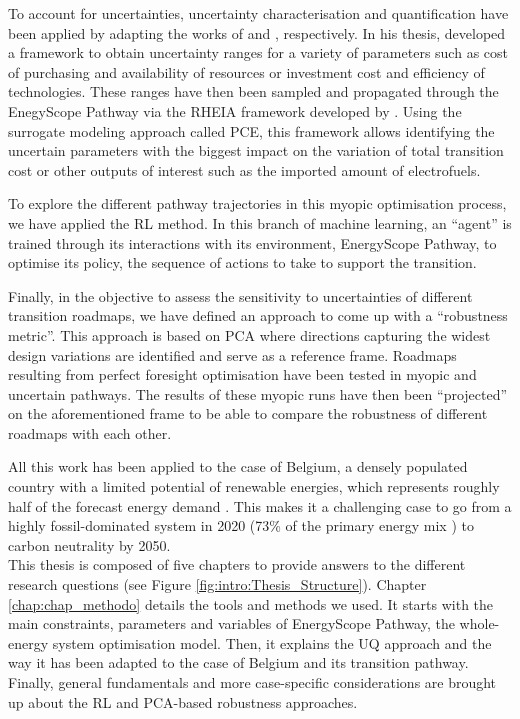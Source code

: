 To account for uncertainties, uncertainty characterisation and quantification have been applied by adapting the works of \citet{Moret2017PhDThesis} and \citet{coppittersthesis}, respectively. In his thesis, \citet{Moret2017PhDThesis} developed a framework to obtain uncertainty ranges for a variety of parameters such as cost of purchasing and availability of resources or investment cost and efficiency of technologies. These ranges have then been sampled and propagated through the EnegyScope Pathway via the RHEIA framework developed by \citet{coppittersthesis}. Using the surrogate modeling approach called \gls{PCE}, this framework allows identifying the uncertain parameters with the biggest impact on the variation of total transition cost or other outputs of interest such as the imported amount of electrofuels. 

To explore the different pathway trajectories in this myopic optimisation process, we have applied the \acrfull{RL} method. In this branch of machine learning, an ``agent'' is trained through its interactions with its environment, EnergyScope Pathway, to optimise its policy, \ie the sequence of actions to take to support the transition. 

Finally, in the objective to assess the sensitivity to uncertainties of different transition roadmaps, we have defined an approach to come up with a ``robustness metric''. This approach is based on \gls{PCA} where directions capturing the widest design variations are identified and serve as a reference frame. Roadmaps resulting from perfect foresight optimisation have been tested in myopic and uncertain pathways. The results of these myopic runs have then been ``projected'' on the aforementioned frame to be able to compare the robustness of different roadmaps with each other.

All this work has been applied to the case of Belgium, a densely populated country with a limited potential of renewable energies, which represents roughly half of the forecast energy demand \cite{Limpens2020}. This makes it a challenging case to go from a highly fossil-dominated system in 2020 (73\% of the primary energy mix \cite{spf_economy_2022}) to carbon neutrality by 2050.\\

\noindent
This thesis is composed of five chapters to provide answers to the different research questions (see Figure \ref{fig:intro:Thesis_Structure}). Chapter \ref{chap:chap_methodo} details the tools and methods we used. It starts with the main constraints, parameters and variables of EnergyScope Pathway, the whole-energy system optimisation model. Then, it explains the \acrfull{UQ} approach and the way it has been adapted to the case of Belgium and its transition pathway. Finally, general fundamentals and more case-specific considerations are brought up about the \gls{RL} and \gls{PCA}-based robustness approaches.

